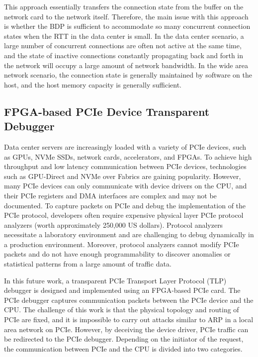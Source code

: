 This approach essentially transfers the connection state from the buffer on the network card to the network itself. Therefore, the main issue with this approach is whether the BDP is sufficient to accommodate so many concurrent connection states when the RTT in the data center is small. In the data center scenario, a large number of concurrent connections are often not active at the same time, and the state of inactive connections constantly propagating back and forth in the network will occupy a large amount of network bandwidth. In the wide area network scenario, the connection state is generally maintained by software on the host, and the host memory capacity is generally sufficient.

\subsection{FPGA-based PCIe Device Transparent Debugger}

Data center servers are increasingly loaded with a variety of PCIe devices, such as GPUs, NVMe SSDs, network cards, accelerators, and FPGAs. To achieve high throughput and low latency communication between PCIe devices, technologies such as GPU-Direct and NVMe over Fabrics are gaining popularity. However, many PCIe devices can only communicate with device drivers on the CPU, and their PCIe registers and DMA interfaces are complex and may not be documented. To capture packets on PCIe and debug the implementation of the PCIe protocol, developers often require expensive physical layer PCIe protocol analyzers (worth approximately 250,000 US dollars). Protocol analyzers necessitate a laboratory environment and are challenging to debug dynamically in a production environment. Moreover, protocol analyzers cannot modify PCIe packets and do not have enough programmability to discover anomalies or statistical patterns from a large amount of traffic data.

In this future work, a transparent PCIe Transport Layer Protocol (TLP) debugger is designed and implemented using an FPGA-based PCIe card. The PCIe debugger captures communication packets between the PCIe device and the CPU. The challenge of this work is that the physical topology and routing of PCIe are fixed, and it is impossible to carry out attacks similar to ARP in a local area network on PCIe. However, by deceiving the device driver, PCIe traffic can be redirected to the PCIe debugger. Depending on the initiator of the request, the communication between PCIe and the CPU is divided into two categories.

